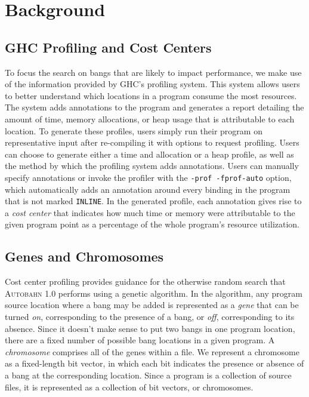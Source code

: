 \documentclass[format=sigplan, review=true]{acmart}
\newcommand{\Ao}[0]{\textsc{Autobahn 1.0}}
\begin{document}
\section{Background}

\subsection{GHC Profiling and Cost Centers}
To focus the search on bangs that are likely to impact performance, we
make use of the information provided by GHC's profiling system.
This system allows users to better understand which locations
in a program consume the most resources.  The system adds annotations
to the program and generates a report detailing the amount of time,
memory allocations, or heap usage that is attributable to each location.
To generate these profiles, users simply run their program on
representative input after re-compiling it with options to request profiling.
Users can choose to generate either a time and allocation or a heap
profile, as well as the method by which the profiling system adds
annotations. Users can manually specify
annotations or invoke the profiler with  the \texttt{-prof -fprof-auto} option, which
automatically adds an annotation around every binding in the program
that is not marked \texttt{INLINE}.  In the generated profile, each
annotation gives rise to a \textit{cost center} that indicates how
much time or memory were attributable to the given program point as a
percentage of the whole program's resource utilization.  


\subsection{Genes and Chromosomes}

Cost center profiling provides guidance for the otherwise random
search that \Ao{} performs using a genetic algorithm. In the
algorithm, any program source location where a bang may be added is
represented as a \textit{gene} that can be turned \textit{on},
corresponding to the presence of a bang, or \textit{off},
corresponding to its absence.  Since it doesn't make sense to put two
bangs in one program location, there are a fixed number of possible
bang locations in a given program. A \textit{chromosome} comprises all
of the genes within a file. We represent a chromosome as a
fixed-length bit vector, in which each bit indicates the presence or
absence of a bang at the corresponding location. Since a program is a
collection of source files, it is represented as a collection of bit
vectors, or chromosomes.
\end{document}
